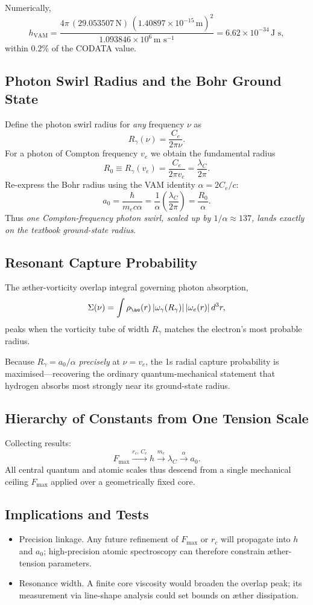 Numerically,
\[
h_{\text{VAM}} = \frac{4\pi\,(29.053507\,\text{N})\,(1.40897\times10^{-15}\,\text{m})^2}{1.093846\times10^{6}\,\text{m s}^{-1}} = 6.62\times10^{-34}\,\text{J s},
\]
within $0.2\%$ of the CODATA value.

\subsection{Photon Swirl Radius and the Bohr Ground State}

Define the photon swirl radius for \textit{any} frequency $\nu$ as
\[
R_{\gamma}(\nu) = \frac{C_e}{2\pi\nu}.
\]
For a photon of Compton frequency $v_e$ we obtain the fundamental radius
\[
R_0 \equiv R_{\gamma}(v_e) = \frac{C_e}{2\pi v_e} = \frac{\lambda_C}{2\pi}.
\]
Re-express the Bohr radius using the VAM identity $\alpha = 2C_e/c$:
\[
a_0 = \frac{\hbar}{m_e c \alpha} = \frac{1}{\alpha} \left( \frac{\lambda_C}{2\pi} \right) = \frac{R_0}{\alpha}. \tag{X.2}
\]
Thus \textit{one Compton-frequency photon swirl, scaled up by $1/\alpha \approx 137$, lands exactly on the textbook ground-state radius}.

\subsection{Resonant Capture Probability}

The \ae ther-vorticity overlap integral governing photon absorption,
\[
\Sigma(\nu) = \int \rho_{\ae}(r)\,|\omega_{\gamma}(R_{\gamma})|\,|\omega_e(r)|\,d^3r,
\]
peaks when the vorticity tube of width $R_{\gamma}$ matches the electron's most probable radius.

Because $R_{\gamma} = a_0/\alpha$ \textit{precisely} at $\nu = v_e$, the 1s radial capture probability is maximised---recovering the ordinary quantum-mechanical statement that hydrogen absorbs most strongly near its ground-state radius.

\subsection{Hierarchy of Constants from One Tension Scale}

Collecting results:
\[
F_{\max} \xrightarrow{r_c,\,C_e} \boxed{h} \xrightarrow{m_e} \lambda_C \xrightarrow{\alpha} a_0.
\]
All central quantum and atomic scales thus descend from a single mechanical ceiling $F_{\max}$ applied over a geometrically fixed core.

\subsection{Implications and Tests}

\begin{itemize}
    \item Precision linkage. Any future refinement of $F_{\max}$ or $r_c$ will propagate into $h$ and $a_0$; high-precision atomic spectroscopy can therefore constrain \ae ther-tension parameters.
    \item Resonance width. A finite core viscosity would broaden the overlap peak; its measurement via line-shape analysis could set bounds on \ae ther dissipation.
\end{itemize}
